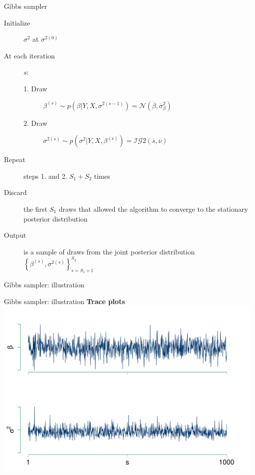\documentclass[notes,blackandwhite,mathsans]{beamer}
\begin{document}
\begin{frame}{Gibbs sampler}

\small
\bigskip\begin{description}
\item[Initialize] $\sigma^2$ {\color{mcxs2}at} $\sigma^{2(0)}$
\item[At each iteration] $s$:
\begin{description}
\item[1. Draw] $\beta^{(s)}\sim p\left(\beta|Y,X,\sigma^{2(s-1)}\right) = \mathcal{N}\left(\overline{\beta}, \overline{\sigma}_{\beta}^2\right)$

\smallskip\item[2. Draw] $\sigma^{2(s)}\sim p\left(\sigma^2|Y,X,\beta^{(s)}\right)=\mathcal{IG}2\left( \overline{s}, \overline{\nu} \right)$
\end{description}
\item[Repeat] {\color{mcxs2}steps} 1. {\color{mcxs2}and} 2. $S_1 + S_2$ {\color{mcxs2}times}
\item[Discard] {\color{mcxs2}the first} $S_1$ {\color{mcxs2}draws that allowed the algorithm to} {\color{mcxs3}converge to the stationary posterior distribution}
\item[Output] {\color{mcxs2}is a sample of draws from the joint posterior distribution} $\left\{ \beta^{(s)}, \sigma^{2(s)} \right\}_{s=S_1+1}^{S_2}$
\end{description}

\end{frame}





{
\begin{frame}{Gibbs sampler: illustration}
\end{frame}
}




{
\begin{frame}{Gibbs sampler: illustration}
\centering
\textbf{Trace plots}\\
\includegraphics[scale=0.45]{./grphs/bs-trace.pdf}

\end{frame}
}
\end{document}
